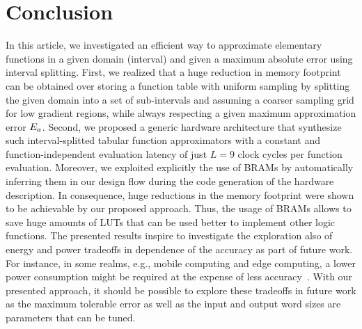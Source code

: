\section{Conclusion}
\label{sec:conclusion}
In this article, we investigated an efficient way to approximate elementary functions in a given domain (interval) and given a maximum absolute error using interval splitting.
First, we realized {that a huge reduction in memory footprint can be obtained over storing a function table with uniform sampling by} splitting the given {domain} into a set of sub-intervals and assuming a coarser sampling grid for low gradient regions, while {always respecting a} given maximum approximation error $E_a$.
Second, we proposed a generic hardware architecture that synthesize such interval-splitted tabular function approximators with {a constant and function-independent} evaluation latency of just $L=9$ clock cycles per function evaluation.
{Moreover,} we exploited explicitly the use of \acp{BRAM} by automatically inferring them in our design flow during the code generation of the hardware description.
In consequence, {huge} reductions in the memory footprint were shown to be achievable by our proposed approach. 
{Thus, the usage of BRAMs allows to save huge amounts of LUTs that can be used better to implement other logic functions.}
{The presented results inspire to investigate the exploration also of energy and power tradeoffs in dependence of the accuracy as part of future work.
For instance, in some realms, e.g., mobile computing and edge computing, a lower power consumption might be required at the expense of less accuracy~\cite{Ota:2017,Pouyanfar:2018,Kong:2022}. 
With our presented approach, it should be possible to explore these tradeoffs in future work as the maximum tolerable error as well as the input and output word sizes are parameters that can be tuned.}
